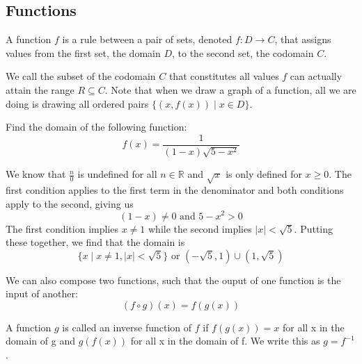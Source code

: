 \subsection{Functions}
\begin{definition}
    A function $f$ is a rule between a pair of sets, denoted $f: D \to C$, that assigns values from the first set, the domain $D$, to the second set, the codomain $C$.
\end{definition}

We call the subset of the codomain $C$ that constitutes all values $f$ can actually attain the range $R \subseteq C$. 
Note that when we draw a graph of a function, all we are doing is drawing all ordered pairs $\{(x, f(x)) \mid x \in D\}$.

\begin{example}
    Find the domain of the following function:
    \begin{equation*}
        f(x) = \frac{1}{(1 - x)\sqrt{5 - x^2}}
    \end{equation*}
\end{example}

\begin{answer}
    We know that $\frac{n}{0}$ is undefined for all $n \in \mathbb{R}$ and $\sqrt{x}$ is only defined for $x \geq 0$. 
    The first condition applies to the first term in the denominator and both conditions apply to the second, giving us
    \begin{equation*}
        (1 - x) \neq 0 \text{ and } 5 - x^2 > 0
    \end{equation*}
    The first condition implies $x \neq 1$ while the second implies $|x| < \sqrt{5}$.
    Putting these together, we find that the domain is
    \begin{equation*}
        \{x \mid x \neq 1, |x| < \sqrt{5}\} \text{ or } (-\sqrt{5}, 1) \cup (1, \sqrt{5})
    \end{equation*}
\end{answer}

We can also compose two functions, such that the ouput of one function is the input of another: 
\begin{equation*}
    (f \circ g)(x) = f(g(x))
\end{equation*}

\begin{definition}
    A function $g$ is called an inverse function of $f$ if $f(g(x)) = x$ for all x in the domain of g and $g(f(x))$ for all x in the domain of f. 
    We write this as $g = f^{-1}$.
\end{definition}

